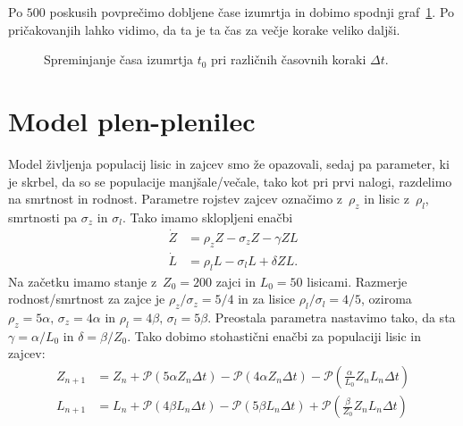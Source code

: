 \documentclass[a4paper,pdftex,11pt]{article}
\numberwithin{figure}{section} %
\begin{document}
Po $500$ poskusih povprečimo dobljene čase izumrtja in dobimo spodnji graf~\ref{slika21}.
Po pričakovanjih lahko vidimo, da ta je ta čas za večje korake veliko daljši.
\begin{figure}[H] 
    \centering 
    \resizebox{0.7\textwidth}{!}{} 
    \caption{Spreminjanje časa izumrtja $t_0$ pri različnih časovnih koraki $\Delta t$.}
    \label{slika21}
\end{figure}

\pagebreak
\section{Model plen-plenilec}
Model življenja populacij lisic in zajcev smo že opazovali, sedaj pa parameter, ki je 
skrbel, da so se populacije manjšale/večale, tako kot pri prvi nalogi, razdelimo na smrtnost
in rodnost. Parametre rojstev zajcev označimo z~$\rho_z$ in lisic z~$\rho_l$, smrtnosti 
pa $\sigma_z$ in $\sigma_l$. Tako imamo sklopljeni enačbi
\begin{align}
    \dot{Z} &= \rho_z Z - \sigma_z Z - \gamma Z L \\
    \dot{L} &= \rho_l L - \sigma_l L + \delta Z L.
\end{align}
Na začetku imamo stanje z~$Z_0=200$ zajci in $L_0=50$ lisicami. Razmerje rodnost/smrtnost
za zajce je $\rho_z/\sigma_z = 5/4$ in za lisice $\rho_l/\sigma_l = 4/5$, oziroma
$\rho_z = 5\alpha, \, \sigma_z = 4\alpha$ in $\rho_l = 4\beta, \, \sigma_l = 5\beta$. 
Preostala parametra nastavimo tako, da sta $\gamma = \alpha /L_0$ in $\delta = \beta/Z_0$.
Tako dobimo stohastični enačbi za populaciji lisic in zajcev:
\begin{align}
    Z_{n+1} &= Z_{n} + \mathcal{P}(5 \alpha Z_n \Delta t) - \mathcal{P}(4 \alpha Z_n 
    \Delta t) - \mathcal{P}( \frac{\alpha}{L_0} Z_n L_n \Delta t) \\
    L_{n+1} &= L_{n} + \mathcal{P}(4 \beta L_n \Delta t) - \mathcal{P}(5 \beta L_n 
    \Delta t) + \mathcal{P}( \frac{\beta}{Z_0} Z_n L_n \Delta t)
\end{align}
\end{document}
